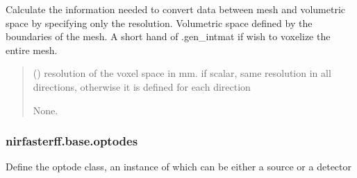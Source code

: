 \documentclass[letterpaper,10pt,english]{sphinxmanual}
\begin{document}
\begin{fulllineitems}
\begin{fulllineitems}
\begin{quote}
\begin{description}
\end{description}\end{quote}

\end{fulllineitems}


\begin{fulllineitems}
\label{\detokenize{_autosummary/nirfasterff.base.mesh.mesh:nirfasterff.base.mesh.mesh.voxelize}}
\pysigstartsignatures
\pysiglinewithargsret
{}
{}
{}
\pysigstopsignatures
\sphinxAtStartPar
Calculate the information needed to convert data between mesh and volumetric space by specifying only the resolution.
Volumetric space defined by the boundaries of the mesh. A short hand of .gen\_intmat if wish to voxelize the entire mesh.
\begin{quote}\begin{description}
\sphinxAtStartPar
{} () \textendash{} resolution of the voxel space in mm.
if scalar, same resolution in all directions, otherwise it is defined for each direction

\sphinxAtStartPar
None.

\end{description}\end{quote}

\end{fulllineitems}


\end{fulllineitems}


\sphinxstepscope


\subsubsection{nirfasterff.base.optodes}
\label{\detokenize{_autosummary/nirfasterff.base.optodes:module-nirfasterff.base.optodes}}\label{\detokenize{_autosummary/nirfasterff.base.optodes:nirfasterff-base-optodes}}\label{\detokenize{_autosummary/nirfasterff.base.optodes::doc}}
\sphinxAtStartPar
Define the optode class, an instance of which can be either a source or a detector
\end{document}
